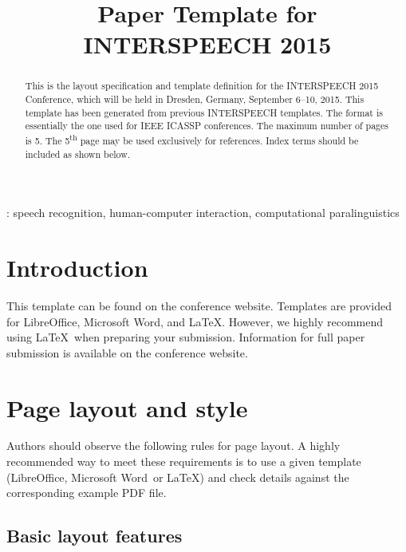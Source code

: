 \documentclass[a4paper]{article}
\title{Paper Template for INTERSPEECH 2015}
\begin{document}
  \maketitle
  \begin{abstract}
    This is the layout specification and template definition for the INTERSPEECH 2015 Conference, which will be held in Dresden, Germany, September 6--10, 2015. 
    This template has been generated from previous INTERSPEECH templates. 
    The format is essentially the one used for IEEE ICASSP conferences. 
    The maximum number of pages is 5. 
    The 5\textsuperscript{th} page may be used exclusively for references. 
    Index terms should be included as shown below.
  \end{abstract}
  : speech recognition, human-computer interaction, computational paralinguistics


  \section{Introduction}

    This template can be found on the conference website.
    Templates are provided for LibreOffice, Microsoft Word\textregistered, and \LaTeX.
    However, we highly recommend using \LaTeX\ when preparing your submission.     
    Information for full paper submission is available on the conference website.

  
  \section{Page layout and style}

    Authors should observe the following rules for page layout. 
    A highly recommended way to meet these requirements is to use a given template (LibreOffice, Microsoft Word\textregistered\ or \LaTeX) and check details against the corresponding example PDF file.

  
    \subsection{Basic layout features}
\end{document}
